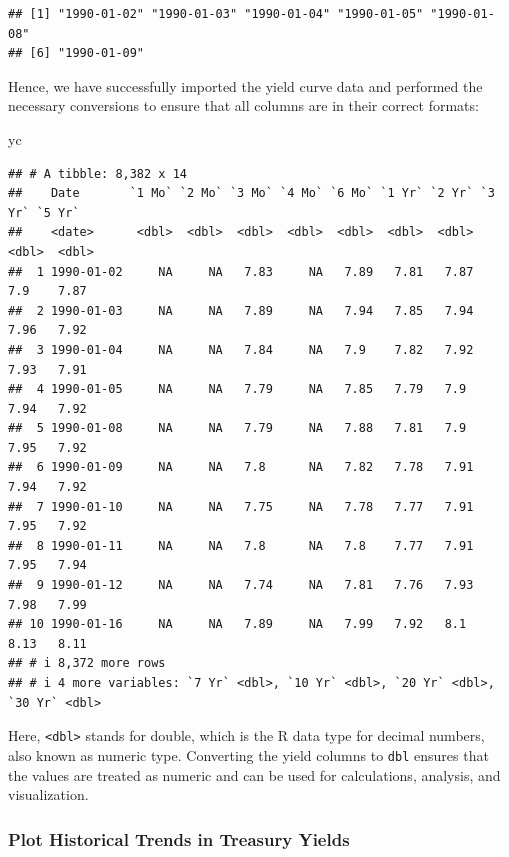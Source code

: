 \documentclass[
]{book}
\newenvironment{Shaded}{\begin{snugshade}}{\end{snugshade}}
\newcommand{\NormalTok}[1]{#1}
\begin{document}
\begin{verbatim}
## [1] "1990-01-02" "1990-01-03" "1990-01-04" "1990-01-05" "1990-01-08"
## [6] "1990-01-09"
\end{verbatim}

Hence, we have successfully imported the yield curve data and performed the necessary conversions to ensure that all columns are in their correct formats:

\begin{Shaded}
\begin{Highlighting}[]
\NormalTok{yc}
\end{Highlighting}
\end{Shaded}

\begin{verbatim}
## # A tibble: 8,382 x 14
##    Date       `1 Mo` `2 Mo` `3 Mo` `4 Mo` `6 Mo` `1 Yr` `2 Yr` `3 Yr` `5 Yr`
##    <date>      <dbl>  <dbl>  <dbl>  <dbl>  <dbl>  <dbl>  <dbl>  <dbl>  <dbl>
##  1 1990-01-02     NA     NA   7.83     NA   7.89   7.81   7.87   7.9    7.87
##  2 1990-01-03     NA     NA   7.89     NA   7.94   7.85   7.94   7.96   7.92
##  3 1990-01-04     NA     NA   7.84     NA   7.9    7.82   7.92   7.93   7.91
##  4 1990-01-05     NA     NA   7.79     NA   7.85   7.79   7.9    7.94   7.92
##  5 1990-01-08     NA     NA   7.79     NA   7.88   7.81   7.9    7.95   7.92
##  6 1990-01-09     NA     NA   7.8      NA   7.82   7.78   7.91   7.94   7.92
##  7 1990-01-10     NA     NA   7.75     NA   7.78   7.77   7.91   7.95   7.92
##  8 1990-01-11     NA     NA   7.8      NA   7.8    7.77   7.91   7.95   7.94
##  9 1990-01-12     NA     NA   7.74     NA   7.81   7.76   7.93   7.98   7.99
## 10 1990-01-16     NA     NA   7.89     NA   7.99   7.92   8.1    8.13   8.11
## # i 8,372 more rows
## # i 4 more variables: `7 Yr` <dbl>, `10 Yr` <dbl>, `20 Yr` <dbl>, `30 Yr` <dbl>
\end{verbatim}

Here, \texttt{\textless{}dbl\textgreater{}} stands for double, which is the R data type for decimal numbers, also known as numeric type. Converting the yield columns to \texttt{dbl} ensures that the values are treated as numeric and can be used for calculations, analysis, and visualization.

\hypertarget{plot-historical-trends-in-treasury-yields}{%
\subsubsection*{Plot Historical Trends in Treasury Yields}\label{plot-historical-trends-in-treasury-yields}}
\end{document}
